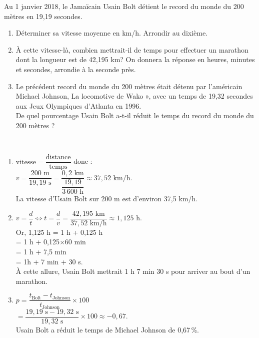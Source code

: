 \pagebreak  
 

\begin{exercice}[CRPE 2018 G3]
Au 1 janvier 2018, le Jamaïcain Usain Bolt détient le record du monde du 200 mètres en 19,19 secondes.
\begin{enumerate}
   \item Déterminer sa vitesse moyenne en km/h. Arrondir au dixième.
   \item À cette vitesse-là, combien mettrait-il de temps pour effectuer un marathon dont la longueur est de 42,195 km? On donnera la réponse en heures, minutes et secondes, arrondie à la seconde près.
   \item Le précédent record du monde du 200 mètres était détenu par l’américain Michael Johnson, \og La locomotive de Wako \fg», avec un temps de 19,32 secondes aux Jeux Olympiques d’Atlanta en 1996. \\
   De quel pourcentage Usain Bolt a-t-il réduit le temps du record du monde du 200 mètres ?
\end{enumerate}
\end{exercice}

\begin{corrige}
\ \\ [-5mm]
   \begin{enumerate}
      \item $\text{vitesse} =\dfrac{\text{distance}}{\text{temps}}$ donc : \\ [1mm]
         $v =\dfrac{200\text{ m}}{19,19\text{ s}} =\dfrac{0,2\text{ km}}{\dfrac{19,19}{3\,600\text{ h}}} \approx37,52\text{ km/h}.$ \\ [1mm] 
        {\blue La vitesse d'Usain Bolt sur 200 m est d'environ 37,5 km/h.} \\ [1mm]
      \item $v =\dfrac{d}{t} \iff t =\dfrac{d}{v} =\dfrac{42,195\text{ km}}{37,52\text{ km/h}} \approx1,125\text{ h}$. \\ [1mm] 
         Or, 1,125 h = 1 h + 0,125 h \\
         \hspace*{1.54cm} = 1 h + 0,125$\times$60 min \\
         \hspace*{1.54cm} = 1 h + 7,5 min \\
         \hspace*{1.54cm} = 1h + 7 min + 30 s. \\
         {\blue À cette allure, Usain Bolt mettrait 1 h 7 min 30 s pour arriver au bout d'un marathon.} \\ [1mm]
      \item $p =\dfrac{t_{\text{Bolt}}-t_{\text{Johnson}}}{t_{\text{Johnson}}}\times100$ \\ [1mm]
          \hspace*{6.5mm} $=\dfrac{19,19\text{ s}-19,32\text{ s}}{19,32\text{ s}}\times100 \approx-0,67$. \\ [1mm]
         {\blue Usain Bolt a réduit le temps de Michael Johnson de 0,67\,\%.}
   \end{enumerate} 
\end{corrige}


